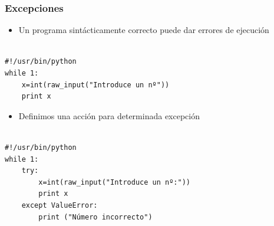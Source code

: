 \documentclass{beamer}
\begin{document}








\begin{frame}[fragile]
\frametitle{Excepciones}
\begin{itemize}
\item Un programa sintácticamente correcto puede dar errores de ejecución
\end{itemize}

  \begin{footnotesize}
\begin{verbatim}

#!/usr/bin/python
while 1:
    x=int(raw_input("Introduce un nº"))
    print x

\end{verbatim}
  \end{footnotesize}

\end{frame}




\begin{frame}[fragile]

\begin{itemize}
\item  Definimos una acción para determinada excepción
\end{itemize}

  \begin{footnotesize}
\begin{verbatim}

#!/usr/bin/python
while 1:
    try:
        x=int(raw_input("Introduce un nº:"))
        print x
    except ValueError:
        print ("Número incorrecto")

\end{verbatim}
  \end{footnotesize}


\end{frame}
\end{document}
